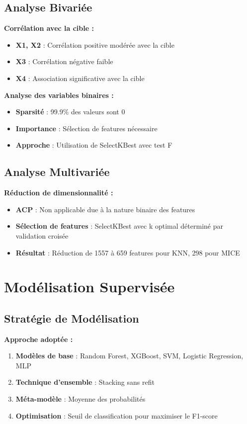 \documentclass[12pt,a4paper]{article}
\begin{document}
\subsection{Analyse Bivariée}

\textbf{Corrélation avec la cible :}
\begin{itemize}
    \item \textbf{X1, X2} : Corrélation positive modérée avec la cible
    \item \textbf{X3} : Corrélation négative faible
    \item \textbf{X4} : Association significative avec la cible
\end{itemize}

\textbf{Analyse des variables binaires :}
\begin{itemize}
    \item \textbf{Sparsité} : 99.9\% des valeurs sont 0
    \item \textbf{Importance} : Sélection de features nécessaire
    \item \textbf{Approche} : Utilisation de SelectKBest avec test F
\end{itemize}

\subsection{Analyse Multivariée}

\textbf{Réduction de dimensionnalité :}
\begin{itemize}
    \item \textbf{ACP} : Non applicable due à la nature binaire des features
    \item \textbf{Sélection de features} : SelectKBest avec k optimal déterminé par validation croisée
    \item \textbf{Résultat} : Réduction de 1557 à 659 features pour KNN, 298 pour MICE
\end{itemize}

\section{Modélisation Supervisée}

\subsection{Stratégie de Modélisation}

\textbf{Approche adoptée :}
\begin{enumerate}
    \item \textbf{Modèles de base} : Random Forest, XGBoost, SVM, Logistic Regression, MLP
    \item \textbf{Technique d'ensemble} : Stacking sans refit
    \item \textbf{Méta-modèle} : Moyenne des probabilités
    \item \textbf{Optimisation} : Seuil de classification pour maximiser le F1-score
\end{enumerate}
\end{document}
